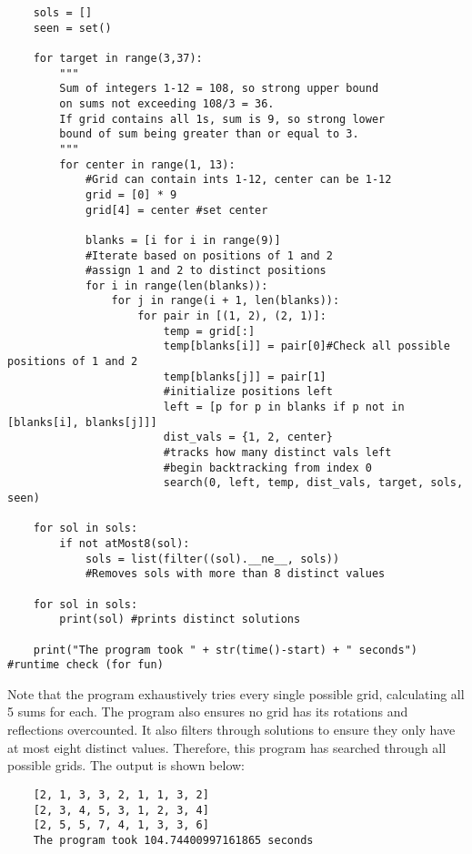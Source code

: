 \documentclass[11pt, letterpaper]{article}
\begin{document}
\begin{solution}{2}
\begin{verbatim}
    sols = []
    seen = set()
    
    for target in range(3,37): 
        """
        Sum of integers 1-12 = 108, so strong upper bound
        on sums not exceeding 108/3 = 36.
        If grid contains all 1s, sum is 9, so strong lower
        bound of sum being greater than or equal to 3.
        """
        for center in range(1, 13):
            #Grid can contain ints 1-12, center can be 1-12
            grid = [0] * 9
            grid[4] = center #set center
    
            blanks = [i for i in range(9)]
            #Iterate based on positions of 1 and 2
            #assign 1 and 2 to distinct positions
            for i in range(len(blanks)):
                for j in range(i + 1, len(blanks)):
                    for pair in [(1, 2), (2, 1)]:
                        temp = grid[:]
                        temp[blanks[i]] = pair[0]#Check all possible positions of 1 and 2 
                        temp[blanks[j]] = pair[1]
                        #initialize positions left
                        left = [p for p in blanks if p not in [blanks[i], blanks[j]]]
                        dist_vals = {1, 2, center} 
                        #tracks how many distinct vals left
                        #begin backtracking from index 0
                        search(0, left, temp, dist_vals, target, sols, seen)
    
    for sol in sols:
        if not atMost8(sol):
            sols = list(filter((sol).__ne__, sols))
            #Removes sols with more than 8 distinct values
    
    for sol in sols:
        print(sol) #prints distinct solutions
    
    print("The program took " + str(time()-start) + " seconds") #runtime check (for fun)
    \end{verbatim}
\newpage
Note that the program exhaustively tries every single possible grid, calculating all 5 sums for each. The program also ensures no grid has its rotations and reflections overcounted. It also filters through solutions to ensure they only have at most eight distinct values. Therefore, this program has searched through all possible grids. The output is shown below:

\begin{verbatim}
    [2, 1, 3, 3, 2, 1, 1, 3, 2]
    [2, 3, 4, 5, 3, 1, 2, 3, 4]
    [2, 5, 5, 7, 4, 1, 3, 3, 6]
    The program took 104.74400997161865 seconds
\end{verbatim}


\end{solution}
\end{document}
